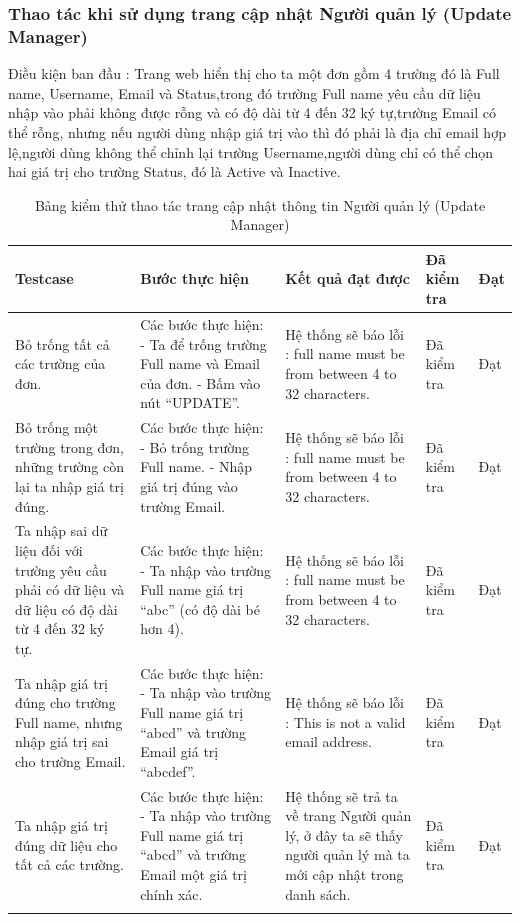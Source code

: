 \documentclass{article}
\begin{document}
\subsubsection{Thao tác khi sử dụng trang cập nhật Người quản lý (Update Manager) }
Điều kiện ban đầu : Trang web hiển thị cho ta một đơn gồm 4 trường đó là Full name, Username, Email và Status,trong đó trường Full name yêu cầu dữ liệu nhập vào phải không được rỗng và có độ dài từ 4 đến 32 ký tự,trường Email có thể rỗng, nhưng nếu người dùng nhập giá trị vào thì đó phải là địa chỉ email hợp lệ,người dùng không thể chỉnh lại trường Username,người dùng chỉ có thể chọn hai giá trị cho trường Status, đó là Active và Inactive. \newline
\begin{longtable}{ | p{} |p{} | p{}  | p{}  | p{}  | } 
\hline
\textbf{Testcase}& \textbf{Bước thực hiện}& \textbf{Kết quả đạt được} & \textbf{Đã kiểm tra}& \textbf{Đạt} \\ 
\hline
\hline
Bỏ trống tất cả các trường của đơn. &
Các bước thực hiện: \newline
- Ta để trống trường Full name và Email của đơn. \newline
- Bấm vào nút “UPDATE”.
&
Hệ thống sẽ báo lỗi : full name must be from between 4 to 32 characters.
&
Đã kiểm tra &
Đạt \\

\hline
Bỏ trống một trường trong đơn, những trường còn lại ta nhập giá trị đúng. &
Các bước thực hiện: \newline
- Bỏ trống trường Full name.  \newline
- Nhập giá trị đúng vào trường Email. 
&
Hệ thống sẽ báo lỗi : full name must be from between 4 to 32 characters.
&
Đã kiểm tra &
Đạt \\

\hline
Ta nhập sai dữ liệu đối với trường yêu cầu phải có dữ liệu và dữ liệu có độ dài từ 4 đến 32 ký tự. &
Các bước thực hiện: \newline
- Ta nhập vào trường Full name giá trị “abc” (có độ dài bé hơn 4). 
&
Hệ thống sẽ báo lỗi : full name must be from between 4 to 32 characters.
&
Đã kiểm tra &
Đạt \\

\hline
Ta nhập giá trị đúng cho trường Full name, nhưng nhập giá trị sai cho trường Email. &
Các bước thực hiện: \newline
- Ta nhập vào trường Full name giá trị “abcd” và trường Email giá trị “abcdef”. 
&
Hệ thống sẽ báo lỗi : This is not a valid email address.
&
Đã kiểm tra &
Đạt \\

\hline
Ta nhập giá trị đúng dữ liệu cho tất cả các trường. &
Các bước thực hiện: \newline
- Ta nhập vào trường Full name giá trị “abcd” và trường Email một giá trị chính xác. 
&
Hệ thống sẽ trả ta về trang Người quản lý, ở đây ta sẽ thấy người quản lý mà ta mới cập nhật trong danh sách.
&
Đã kiểm tra &
Đạt \\

\hline
\caption{Bảng kiểm thử thao tác trang cập nhật thông tin Người quản lý (Update Manager)}
\end{longtable}
\end{document}
